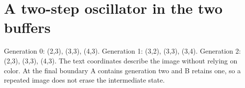 \section{A two-step oscillator in the two
  buffers}\label{008-life-generations-x-oscillator-a-two-step-oscillator-in-the-two-buffers}

Generation 0: (2,3), (3,3), (4,3). Generation 1: (3,2), (3,3), (3,4).
Generation 2: (2,3), (3,3), (4,3). The text coordinates describe the
image without relying on color. At the final boundary A contains
generation two and B retains one, so a repeated image does not erase the
intermediate state.


